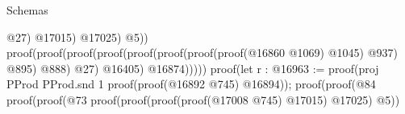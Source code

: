 \begin{lexlean}{Schemas}
\begin{coremodule}
                                                                                                      @27)
                                                                                                    @17015)
                                                                                                  @17025)
                                                                                                @5))
                                                                                          proof(proof(proof(proof(proof(proof(proof(proof(@16860
                                                                                                            @1069)
                                                                                                          @1045)
                                                                                                        @937)
                                                                                                      @895)
                                                                                                    @888)
                                                                                                  @27)
                                                                                                @16405)
                                                                                              @16874)))))
                                                                                proof(let r : @16963 := proof(proj PProd PProd.snd 1
                                                                                    proof(proof(@16892
                                                                                          @745)
                                                                                        @16894));
                                                                                  proof(proof(@84
                                                                                        proof(proof(@73
                                                                                              proof(proof(proof(proof(@17008
                                                                                                        @745)
                                                                                                      @17015)
                                                                                                    @17025)
                                                                                                  @5))

\end{coremodule}
\end{lexlean}

